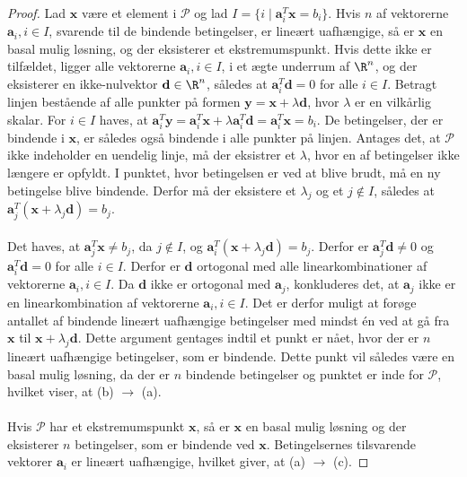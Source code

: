 \begin{proof}
Lad $\textbf{x}$ være et element i $\mathcal{P}$ og lad $I = \{ i \mid \textbf{a}_i^T\textbf{x} = b_i \}$.
Hvis $n$ af vektorerne  $\textbf{a}_i, i \in I$, svarende til de bindende betingelser, er lineært uafhængige, så er $\textbf{x}$ en basal mulig løsning, og der eksisterer et ekstremumspunkt.
Hvis dette ikke er tilfældet, ligger alle vektorerne $\textbf{a}_i, i \in I$, i et ægte underrum af $\R^n$, og der eksisterer en ikke-nulvektor $\textbf{d} \in \R^n$, således at $\textbf{a}_i^T\textbf{d} = 0$ for alle $i \in I$.
Betragt linjen bestående af alle punkter på formen $\textbf{y} = \textbf{x} + \lambda \textbf{d}$, hvor $\lambda$ er en vilkårlig skalar.
For $i \in I$ haves, at $\textbf{a}_i^T\textbf{y} = \textbf{a}_i^T\textbf{x} + \lambda \textbf{a}_i^T\textbf{d} = \textbf{a}_i^T\textbf{x} = b_i$.
De betingelser, der er bindende i $\textbf{x}$, er således også bindende i alle punkter på linjen.
Antages det, at $\mathcal{P}$ ikke indeholder en uendelig linje, må der eksistrer et $\lambda$, hvor en af betingelser ikke længere er opfyldt.
I punktet, hvor betingelsen er ved at blive brudt, må en ny betingelse blive bindende.
Derfor må der eksistere et $\lambda_j$ og et $j \notin I$, således at $\textbf{a}_j^T (\textbf{x} + \lambda_j\textbf{d}) = b_j$.\\\\
%
Det haves, at $\textbf{a}_j^T\textbf{x} \neq b_j$, da $j \notin I$, og $\textbf{a}_i^T (\textbf{x} + \lambda_j\textbf{d}) = b_j$.
Derfor er $\textbf{a}_j^T\textbf{d} \neq 0$ og $\textbf{a}_i^T\textbf{d} = 0$ for alle $i \in I$.
Derfor er $\textbf{d}$ ortogonal med alle linearkombinationer af vektorerne $\textbf{a}_i, i\in I$.
Da $\textbf{d}$ ikke er ortogonal med $\textbf{a}_j$, konkluderes det, at $\textbf{a}_j$ ikke er en linearkombination af vektorerne $\textbf{a}_i, i \in I$.
Det er derfor muligt at forøge antallet af bindende lineært uafhængige betingelser med mindst én ved at gå fra $\textbf{x}$ til $\textbf{x} + \lambda_j\textbf{d}$.
Dette argument gentages indtil et punkt er nået, hvor der er $n$ lineært uafhængige betingelser, som er bindende.
Dette punkt vil således være en basal mulig løsning, da der er $n$ bindende betingelser og punktet er inde for $\mathcal{P}$, hvilket viser, at (b) $\rightarrow$ (a).\\\\
%
Hvis $\mathcal{P}$ har et ekstremumspunkt $\textbf{x}$, så er $\textbf{x}$ en basal mulig løsning og der eksisterer $n$ betingelser, som er bindende ved $\textbf{x}$.
Betingelsernes tilsvarende vektorer $\textbf{a}_i$ er lineært uafhængige, hvilket giver, at (a) $\rightarrow$ (c).

\end{proof}

